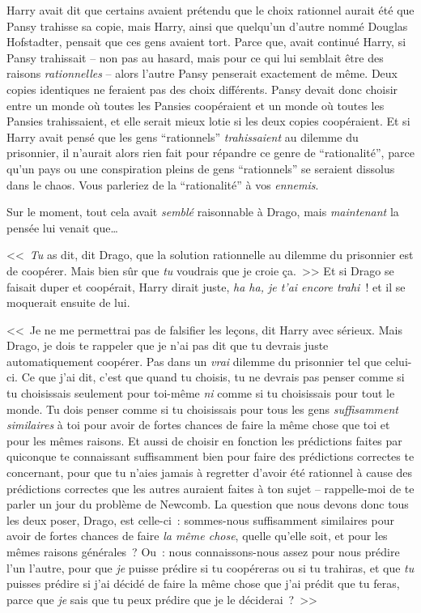 Harry avait dit que certains avaient prétendu que le choix rationnel aurait été que Pansy trahisse sa copie, mais Harry, ainsi que quelqu'un d'autre nommé Douglas Hofstadter, pensait que ces gens avaient tort. Parce que, avait continué Harry, si Pansy trahissait -- non pas au hasard, mais pour ce qui lui semblait être des raisons \emph{rationnelles} -- alors l'autre Pansy penserait exactement de même. Deux copies identiques ne feraient pas des choix différents. Pansy devait donc choisir entre un monde où toutes les Pansies coopéraient et un monde où toutes les Pansies trahissaient, et elle serait mieux lotie si les deux copies coopéraient. Et si Harry avait pensé que les gens “rationnels” \emph{trahissaient} au dilemme du prisonnier, il n'aurait alors rien fait pour répandre ce genre de “rationalité”, parce qu'un pays ou une conspiration pleins de gens “rationnels” se seraient dissolus dans le chaos. Vous parleriez de la “rationalité” à vos \emph{ennemis}.

Sur le moment, tout cela avait \emph{semblé} raisonnable à Drago, mais \emph{maintenant} la pensée lui venait que…

<<~\emph{Tu} as dit, dit Drago, que la solution rationnelle au dilemme du prisonnier est de coopérer. Mais bien sûr que \emph{tu} voudrais que je croie ça.~>> Et si Drago se faisait duper et coopérait, Harry dirait juste, \emph{ha ha, je t'ai encore trahi}~! et il se moquerait ensuite de lui.

<<~Je ne me permettrai pas de falsifier les leçons, dit Harry avec sérieux. Mais Drago, je dois te rappeler que je n'ai pas dit que tu devrais juste automatiquement coopérer. Pas dans un \emph{vrai} dilemme du prisonnier tel que celui-ci. Ce que j'ai dit, c'est que quand tu choisis, tu ne devrais pas penser comme si tu choisissais seulement pour toi-même \emph{ni} comme si tu choisissais pour tout le monde. Tu dois penser comme si tu choisissais pour tous les gens \emph{suffisamment similaires} à toi pour avoir de fortes chances de faire la même chose que toi et pour les mêmes raisons. Et aussi de choisir en fonction les prédictions faites par quiconque te connaissant suffisamment bien pour faire des prédictions correctes te concernant, pour que tu n'aies jamais à regretter d'avoir été rationnel à cause des prédictions correctes que les autres auraient faites à ton sujet -- rappelle-moi de te parler un jour du problème de Newcomb. La question que nous devons donc tous les deux poser, Drago, est celle-ci~: sommes-nous suffisamment similaires pour avoir de fortes chances de faire \emph{la même chose}, quelle qu'elle soit, et pour les mêmes raisons générales~? Ou~: nous connaissons-nous assez pour nous prédire l'un l'autre, pour que \emph{je} puisse prédire si tu coopéreras ou si tu trahiras, et que \emph{tu} puisses prédire si j'ai décidé de faire la même chose que j'ai prédit que tu feras, parce que \emph{je} sais que tu peux prédire que je le déciderai~?~>>

